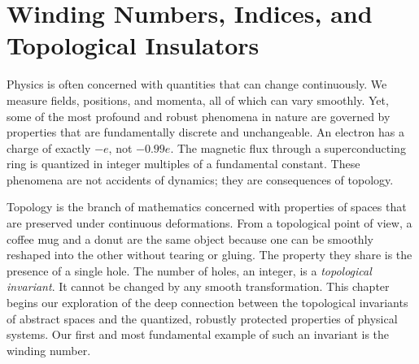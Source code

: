 \chapter{Winding Numbers, Indices, and Topological Insulators}
\label{chap:winding_numbers}

Physics is often concerned with quantities that can change continuously.
We measure fields, positions, and momenta, all of which can vary smoothly.
Yet, some of the most profound and robust phenomena in nature are governed by properties that are fundamentally discrete and unchangeable.
An electron has a charge of exactly $-e$, not $-0.99e$.
The magnetic flux through a superconducting ring is quantized in integer multiples of a fundamental constant.
These phenomena are not accidents of dynamics; they are consequences of topology.

Topology is the branch of mathematics concerned with properties of spaces that are preserved under continuous deformations.
From a topological point of view, a coffee mug and a donut are the same object because one can be smoothly reshaped into the other without tearing or gluing.
The property they share is the presence of a single hole.
The number of holes, an integer, is a \textit{topological invariant}.
It cannot be changed by any smooth transformation.
This chapter begins our exploration of the deep connection between the topological invariants of abstract spaces and the quantized, robustly protected properties of physical systems.
Our first and most fundamental example of such an invariant is the winding number.
 
 






